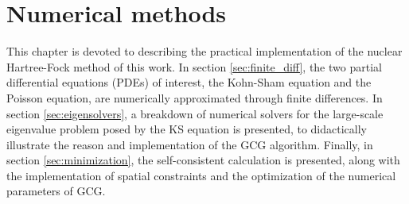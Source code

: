 \chapter{Numerical methods}
This chapter is devoted to describing the practical implementation of the nuclear Hartree-Fock method of this work. In section \ref{sec:finite_diff}, the two partial differential equations (PDEs) of interest, the Kohn-Sham equation and the Poisson equation, are numerically approximated through finite differences. In section \ref{sec:eigensolvers}, a breakdown of numerical solvers for the large-scale eigenvalue problem posed by the KS equation is presented, to didactically illustrate the reason and implementation of the GCG algorithm. Finally, in section \ref{sec:minimization}, the self-consistent calculation is presented, along with the implementation of spatial constraints and the optimization of the numerical parameters of GCG.


